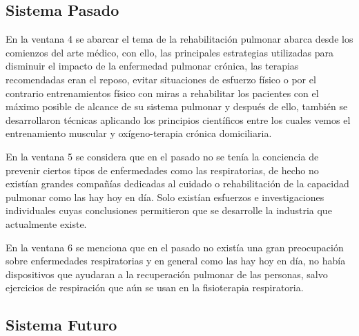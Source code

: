 \documentclass[12pt]{article}
\begin{document}
\subsection{Sistema Pasado}


En la ventana 4 se abarcar el tema de la rehabilitación pulmonar abarca desde los comienzos del arte médico, con ello, las principales estrategias utilizadas para disminuir el impacto de la enfermedad pulmonar crónica, las terapias recomendadas eran el reposo, evitar situaciones de esfuerzo físico o por el contrario entrenamientos físico con miras a rehabilitar los pacientes con el máximo posible de alcance de su sistema pulmonar y después de ello, también se desarrollaron técnicas aplicando los principios científicos entre los cuales vemos el entrenamiento muscular y oxígeno-terapia crónica domiciliaria.


En la ventana 5 se considera que en el pasado no se tenía la conciencia de prevenir ciertos tipos de enfermedades como las respiratorias, de hecho no existían grandes compañías dedicadas al cuidado o rehabilitación de la capacidad pulmonar como las hay hoy en día. Solo existían esfuerzos e investigaciones individuales cuyas conclusiones permitieron que se desarrolle la industria que actualmente existe.


En la ventana 6 se menciona que en el pasado no existía una gran preocupación sobre enfermedades respiratorias y en general como las hay hoy en día, no había dispositivos que ayudaran a la recuperación pulmonar de las personas, salvo ejercicios de respiración que aún se usan en la fisioterapia respiratoria. 




\subsection{Sistema Futuro} 
\end{document}
